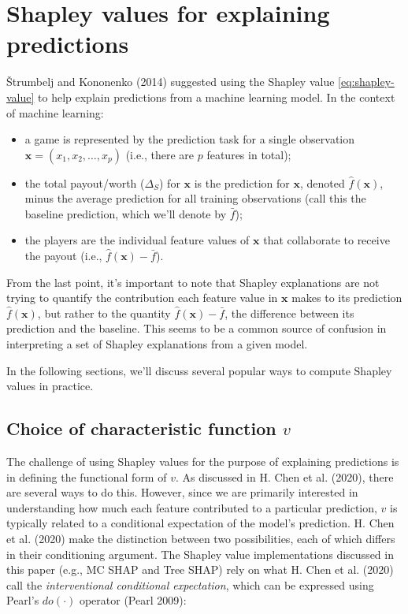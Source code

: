 \hypertarget{shapley-values-for-explaining-predictions}{%
\section{Shapley values for explaining predictions}\label{shapley-values-for-explaining-predictions}}

Štrumbelj and Kononenko (2014) suggested using the Shapley value \eqref{eq:shapley-value} to help explain predictions from a machine learning model. In the context of machine learning:

\begin{itemize}
\item
  a game is represented by the prediction task for a single observation \(\boldsymbol{x} = \left(x_1, x_2, \dots, x_p\right)\) (i.e., there are \(p\) features in total);
\item
  the total payout/worth (\(\Delta_S\)) for \(\boldsymbol{x}\) is the prediction for \(\boldsymbol{x}\), denoted \(\hat{f}\left(\boldsymbol{x}\right)\), minus the average prediction for all training observations (call this the baseline prediction, which we'll denote by \(\bar{f}\));
\item
  the players are the individual feature values of \(\boldsymbol{x}\) that collaborate to receive the payout (i.e., \(\hat{f}\left(\boldsymbol{x}\right) - \bar{f}\)).
\end{itemize}

From the last point, it's important to note that Shapley explanations are not trying to quantify the contribution each feature value in \(\boldsymbol{x}\) makes to its prediction \(\hat{f}\left(\boldsymbol{x}\right)\), but rather to the quantity \(\hat{f}\left(\boldsymbol{x}\right) - \bar{f}\), the difference between its prediction and the baseline. This seems to be a common source of confusion in interpreting a set of Shapley explanations from a given model.

In the following sections, we'll discuss several popular ways to compute Shapley values in practice.

\hypertarget{choice-of-characteristic-function-v}{%
\subsection{\texorpdfstring{Choice of characteristic function \(v\)}{Choice of characteristic function v}}\label{choice-of-characteristic-function-v}}

The challenge of using Shapley values for the purpose of explaining predictions is in defining the functional form of \(v\). As discussed in H. Chen et al. (2020), there are several ways to do this. However, since we are primarily interested in understanding how much each feature contributed to a particular prediction, \(v\) is typically related to a conditional expectation of the model's prediction. H. Chen et al. (2020) make the distinction between two possibilities, each of which differs in their conditioning argument. The Shapley value implementations discussed in this paper (e.g., MC SHAP and Tree SHAP) rely on what H. Chen et al. (2020) call the \emph{interventional conditional expectation}, which can be expressed using Pearl's \(do\left(\cdot\right)\) operator (Pearl 2009):

